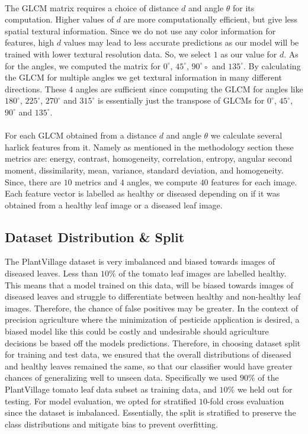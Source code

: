 \paragraph{}
The GLCM matrix requires a choice of distance $d$ and angle $\theta$ for its computation. Higher values of $d$ are more computationally efficient, but give less spatial
textural information. Since we do not use any color information for features,
high $d$ values may lead to less accurate predictions as our model will be trained
with lower textural resolution data. So, we select $1$ as our value for $d$. As for
the angles, we computed the matrix for $0^\circ$, $45^\circ$, $90^\circ$◦ and $135^\circ$. By calculating
the GLCM for multiple angles we get textural information in many different
directions. These 4 angles are sufficient since computing the GLCM for angles
like $180^\circ$, $225^\circ$, $270^\circ$ and $315^\circ$ is essentially just the transpose of GLCMs for $0^\circ$, $45^\circ$, $90^\circ$ and $135^\circ$.

\paragraph{}
For each GLCM obtained from a distance $d$ and angle $\theta$ we calculate several
harlick features from it. Namely as mentioned in the methodology section these
metrics are: energy, contrast, homogeneity, correlation, entropy, angular second
moment, dissimilarity, mean, variance, standard deviation, and homogeneity.
Since, there are $10$ metrics and $4$ angles, we compute $40$ features for each image.
Each feature vector is labelled as healthy or diseased depending on if it was
obtained from a healthy leaf image or a diseased leaf image.

\subsection{Dataset Distribution \& Split}
The PlantVillage dataset is very imbalanced and biased towards images of
diseased leaves. Less than $10\%$ of the tomato leaf images
are labelled healthy. This means that a model trained on this data, will be
biased towards images of diseased leaves and struggle to differentiate between
healthy and non-healthy leaf images. Therefore, the chance of false positives
may be greater. In the context of precision agriculture where the minimization
of pesticide application is desired, a biased model like this could be costly and
undesirable should agriculture decisions be based off the models predictions.
Therefore, in choosing dataset split for training and test data, we ensured that
the overall distributions of diseased and healthy leaves remained the same, so
that our classifier would have greater chances of generalizing well to unseen data.
Specifically we used $90\%$ of the PlantVillage tomato leaf data subset as training
data, and $10\%$ we held out for testing. For model evaluation, we opted for
stratified $10$-fold cross evaluation since the dataset is imbalanced. Essentially,
the split is stratified to preserve the class distributions and mitigate bias to
prevent overfitting.

